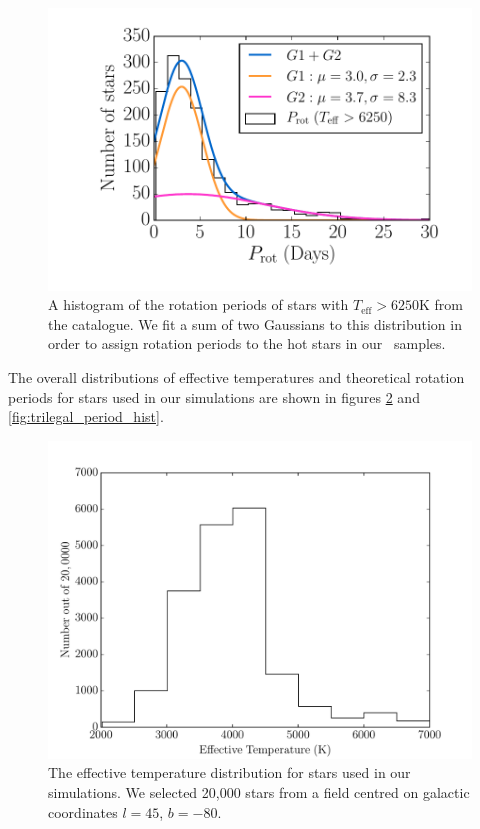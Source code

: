 \begin{figure}
\begin{center}
\includegraphics[width=6in, clip=true]{figures/hot_star_hist.pdf}
\caption[A histogram of the rotation periods of hot stars]
{A histogram of the rotation periods of stars with $T_{\mathrm{eff}} > 6250$K
from the \citet{Mcquillan2014} catalogue.
We fit a sum of two Gaussians to this distribution in order to assign rotation
periods to the hot stars in our \trilegal\ samples.}
\label{fig:hot_star_hist}
\end{center}
\end{figure}

The overall distributions of effective temperatures and theoretical rotation
periods for stars used in our simulations are shown in figures
\ref{fig:trilegal_teff_hist} and \ref{fig:trilegal_period_hist}.

\begin{figure}
\begin{center}
\includegraphics[width=6in, clip=true]{figures/trilegal_teff_hist-80.pdf}
\caption[The effective temperature distribution for stars used in \LSST\
simulations]
{The effective temperature distribution for stars used in our simulations.
We selected 20,000 stars from a field centred on galactic coordinates $l=45$,
$b=-80$.}
\label{fig:trilegal_teff_hist}
\end{center}
\end{figure}

